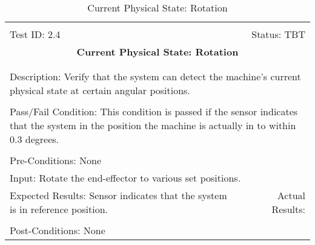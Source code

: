 \documentclass[titlepage]{article}
\begin{document}
\begin{center}%
\begin{table}
\begin{tabular}{|l r|}\hline&\\[-2mm]
	Test ID: 2.4	&Status: TBT\\[-3mm]
	\multicolumn{2}{|c|}{\textbf{\large{Current Physical State: Rotation}}}\\&\\\hline&\\[-3mm]
	\multicolumn{2}{|p{\textwidth}|}{Description: Verify that the system can detect the machine's current physical state at certain angular positions.}\\[1mm]\hline&\\[-3mm]
	\multicolumn{2}{|p{\textwidth}|}{Pass/Fail Condition: This condition is passed if the sensor indicates that the system in the position the machine is actually in to within 0.3 degrees.}\\[1mm]\hline&\\[-3mm]
	\multicolumn{2}{|p{\textwidth}|}{Pre-Conditions: None}\\[4mm]
	\multicolumn{2}{|p{\textwidth}|}{Input: Rotate the end-effector to various set positions.}\\[2mm]\hline
	\multicolumn{1}{|p{0.49\textwidth}}{Expected Results: Sensor indicates that the system is in reference position.}	&\multicolumn{1}{|p{0.45\textwidth}|}{Actual Results:}\\\hline&\\[-3mm]
	\multicolumn{2}{|p{\textwidth}|}{Post-Conditions: None}\\\hline
\end{tabular}
\caption{Current Physical State: Rotation}
\end{table}
\end{center}
\end{document}
